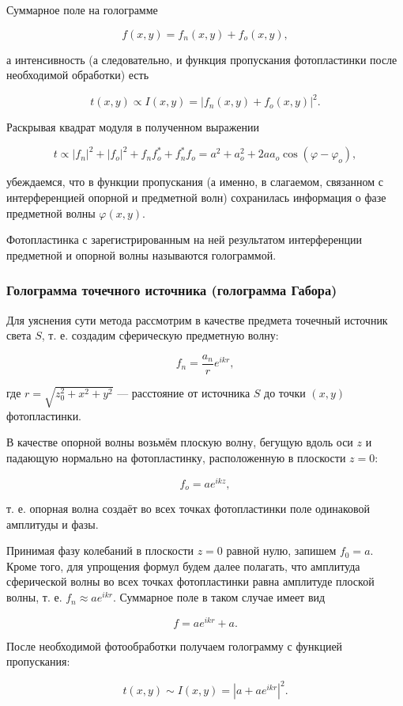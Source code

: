 \documentclass[a4paper,12pt]{article}
\begin{document}
Суммарное поле на голограмме

\[ f(x,y) = f_n(x,y) + f_o(x,y), \]

а интенсивность (а следовательно, и функция пропускания фотопластинки после необходимой обработки) есть

\[ t(x,y) \propto I(x,y) = |f_n(x,y) + f_o(x,y)|^2. \]

Раскрывая квадрат модуля в полученном выражении

\[ t \propto |f_n|^2 + |f_o|^2 + f_nf_o^* + f_n^*f_o = a^2 + a_o^2 + 2aa_o \cos(\varphi - \varphi_o), \]

убеждаемся, что в функции пропускания (а именно, в слагаемом, связанном с интерференцией опорной и предметной волн) сохранилась информация о фазе предметной волны \(\varphi(x,y)\).

Фотопластинка с зарегистрированным на ней результатом интерференции предметной и опорной волны называются голограммой.

\subsubsection{Голограмма точечного источника (голограмма Габора)}

Для уяснения сути метода рассмотрим в качестве предмета точечный источник света \(S\), т. е. создадим сферическую предметную волну:

\[ f_n = \frac{a_n}{r} e^{ikr}, \]

где \( r = \sqrt{z_0^2 + x^2 + y^2} \) — расстояние от источника \(S\) до точки \((x,y)\) фотопластинки.

В качестве опорной волны возьмём плоскую волну, бегущую вдоль оси \(z\) и падающую нормально на фотопластинку, расположенную в плоскости \( z = 0 \):

\[ f_o = ae^{ikz}, \]

т. е. опорная волна создаёт во всех точках фотопластинки поле одинаковой амплитуды и фазы.

Принимая фазу колебаний в плоскости \( z = 0 \) равной нулю, запишем \( f_0 = a \). Кроме того, для упрощения формул будем далее полагать, что амплитуда сферической волны во всех точках фотопластинки равна амплитуде плоской волны, т. е. \( f_n \approx a e^{ikr} \). Суммарное поле в таком случае имеет вид

\[ f = a e^{ikr} + a. \]

После необходимой фотообработки получаем голограмму с функцией пропускания:

\[ t(x,y) \sim I(x,y) = |a + a e^{ikr}|^2. \]
\end{document}
